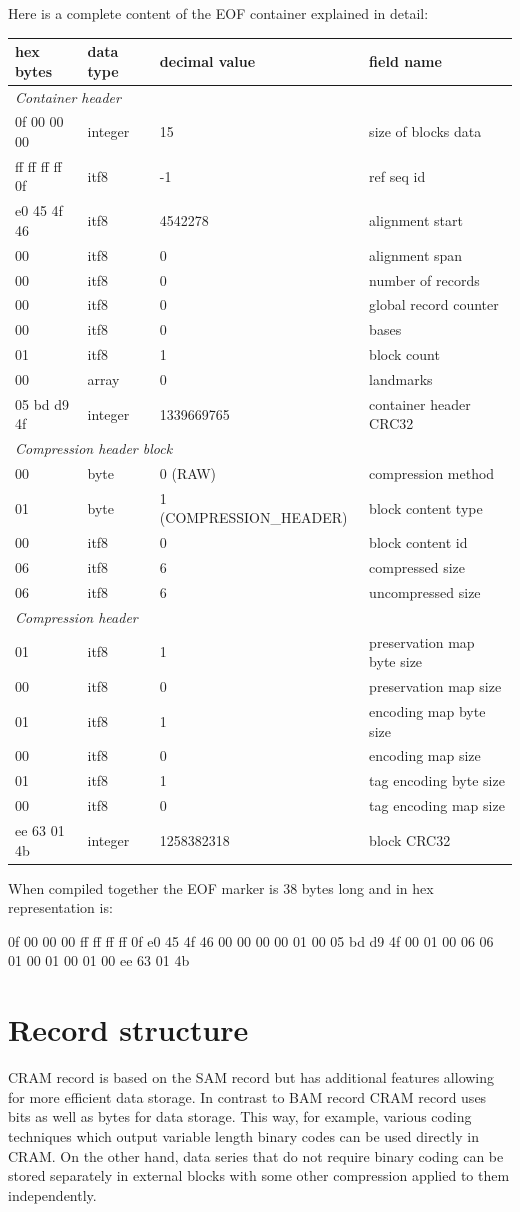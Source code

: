 \documentclass[a4paper]{article}
\begin{document}
Here is a complete content of the EOF container explained in detail:

\begin{tabular}{|l|l|>{\raggedright}p{150pt}|>{\raggedright}p{180pt}|}
\hline
\textbf{hex bytes} & \textbf{data type} & \textbf{decimal value} & \textbf{field 
name}\tabularnewline
\hline
\multicolumn{4}{|l|}{\textit{Container header}}\tabularnewline
\hline
0f 00 00 00 & integer & 15 & size of blocks data\tabularnewline
\hline
ff ff ff ff 0f & itf8 & -1 & ref seq id\tabularnewline
\hline
e0 45 4f 46 & itf8 & 4542278 & alignment start\tabularnewline
\hline
00 & itf8 & 0 & alignment span\tabularnewline
\hline
00 & itf8 & 0 & number of records\tabularnewline
\hline
00 & itf8 & 0 & global record counter\tabularnewline
\hline
00 & itf8 & 0 & bases\tabularnewline
\hline
01 & itf8 & 1 & block count\tabularnewline
\hline
00 & array & 0 & landmarks\tabularnewline
\hline
05 bd d9 4f & integer & 1339669765 & container header CRC32\tabularnewline
\hline
\multicolumn{4}{|l|}{\textit{Compression header block}}\tabularnewline
\hline
00 & byte & 0 (RAW) & compression method\tabularnewline
\hline
01 & byte & 1 (COMPRESSION\_HEADER) & block content type\tabularnewline
\hline
00 & itf8 & 0 & block content id\tabularnewline
\hline
06 & itf8 & 6 & compressed size\tabularnewline
\hline
06 & itf8 & 6 & uncompressed size\tabularnewline
\hline
\multicolumn{4}{|l|}{\textit{Compression header}}\tabularnewline
\hline
01 & itf8 & 1 & preservation map byte size\tabularnewline
\hline
00 & itf8 & 0 & preservation map size\tabularnewline
\hline
01 & itf8 & 1 & encoding map byte size\tabularnewline
\hline
00 & itf8 & 0 & encoding map size\tabularnewline
\hline
01 & itf8 & 1 & tag encoding byte size\tabularnewline
\hline
00 & itf8 & 0 & tag encoding map size\tabularnewline
\hline
ee 63 01 4b & integer & 1258382318 & block CRC32\tabularnewline
\hline
\end{tabular}

When compiled together the EOF marker is 38 bytes long and in hex representation 
is:

0f 00 00 00 ff ff ff ff 0f e0 45 4f 46 00 00 00 00 01 00 05 bd d9 4f 00 01 00 06 06 01 00 01 00 01 00 ee 63 01 4b

\section{\textbf{Record structure}}
\label{sec:record}

CRAM record is based on the SAM record but has additional features allowing for 
more efficient data storage.  In contrast to BAM record CRAM record uses bits as 
well as bytes for data storage. This way, for example, various coding techniques 
which output variable length binary codes can be used directly in CRAM. On the 
other hand, data series that do not require binary coding can be stored separately 
in external blocks with some other compression applied to them independently.
\end{document}
